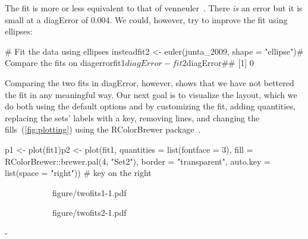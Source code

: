 \documentclass[
  oneside,
  openany,
  numbers=noendperiod,
  parskip=half,
  bibliography=totoc
]{scrbook}\usepackage[]{graphicx}\usepackage{xcolor}
\newlength{\overhang}
\newenvironment{fullwidth}{%
  \blockmargin
  \begin{addmargin*}[0em]{-\overhang}%
}{%
  \end{addmargin*}%
  \unblockmargin
}
\newcommand{\pkg}[1]{{\fontseries{b}\selectfont #1}}
\begin{document}
The fit is more or less equivalent to that of
\pkg{venneuler}~\citep{Wilkinson_2012}. There \emph{is} an error but it is
small at a diagError of 0.004. We could, however, try to
improve the fit using ellipses:

# Fit the data using ellipses insteadfit2 <- euler(junta_2009, shape = "ellipse")# Compare the fits on diagerrorfit1$diagError - fit2$diagError## [1] 0


Comparing the two fits in diagError, however, shows that we have not bettered
the fit in any meaningful way. Our next goal is to visualize the layout, which
we do both using the default options and by customizing the fit, adding
quantities, replacing the sets' labels with a key, removing lines, and changing the
fills~(\cref{fig:plotting}) using the \pkg{RColorBrewer} package~\citep{Neuwirth_2014}.

p1 <- plot(fit1)p2 <- plot(fit1,
           quantities = list(fontface = 3),
           fill = RColorBrewer::brewer.pal(4, "Set2"),
           border = "transparent",
           auto.key = list(space = "right")) # key on the right

\begin{figure}[hbtp]
\caption{The same fit visualized in two distinct ways.\label{fig:plotting}}
\begin{subfigure}[b]{.4\linewidth}
figure/twofits1-1.pdf
\end{subfigure}%
\begin{subfigure}[b]{.6\linewidth}
figure/twofits2-1.pdf
\end{subfigure}
\end{figure}

\begin{fullwidth}


\end{fullwidth}
\end{document}
